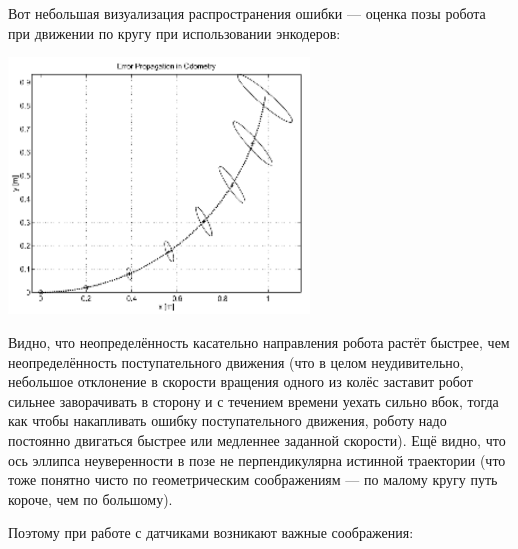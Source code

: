 \documentclass{../../text-style}
\begin{document}
Вот небольшая визуализация распространения ошибки --- оценка позы робота при движении по кругу при использовании энкодеров:

\begin{center}
    \includegraphics[width=0.6\textwidth]{poseUncertainity.png}
\end{center}

Видно, что неопределённость касательно направления робота растёт быстрее, чем неопределённость поступательного движения (что в целом неудивительно, небольшое отклонение в скорости вращения одного из колёс заставит робот сильнее заворачивать в сторону и с течением времени уехать сильно вбок, тогда как чтобы накапливать ошибку поступательного движения, роботу надо постоянно двигаться быстрее или медленнее заданной скорости).
Ещё видно, что ось эллипса неуверенности в позе не перпендикулярна истинной траектории (что тоже понятно чисто по геометрическим соображениям --- по малому кругу путь короче, чем по большому).

Поэтому при работе с датчиками возникают важные соображения:
\end{document}
